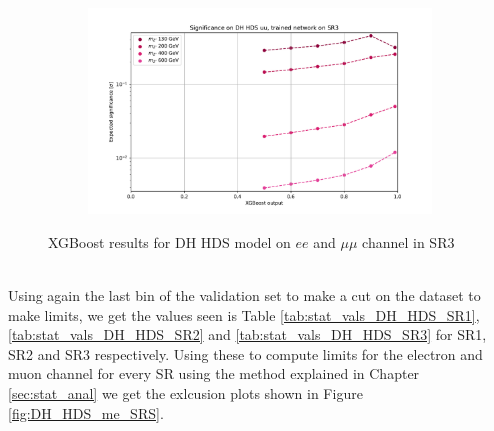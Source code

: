 \documentclass[12pt, a4paper]{book}
\begin{document}
\begin{figure}[!ht]
\begin{subfigure}[b]{0.49\textwidth}
   \end{subfigure}
   \hfill
   \begin{subfigure}[b]{0.49\textwidth}
      \centering
      \includegraphics[width=1\textwidth]{XGBoost/Model_independent/150/DH_HDS/EXP_SIG_uu.pdf}
   \end{subfigure}
   \caption{XGBoost results for DH HDS model on $ee$ and $\mu\mu$ channel in SR3}\label{fig:DH_HDS_SR3}
\end{figure}
\\Using again the last bin of the validation set to make a cut on the dataset to make limits, we get the values seen is Table \ref{tab:stat_vals_DH_HDS_SR1}, \ref{tab:stat_vals_DH_HDS_SR2} and \ref{tab:stat_vals_DH_HDS_SR3} for 
SR1, SR2 and SR3 respectively. Using these to compute limits for the electron and muon channel for every SR using the method explained in Chapter \ref{sec:stat_anal} we get the exlcusion plots shown in Figure \ref{fig:DH_HDS_me_SRS}.\\
\end{document}
